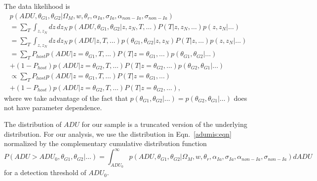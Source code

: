 \documentclass[preprint]{aastex}
\begin{document}
The data likelihood is 
\begin{multline}
p(\mathit{ADU}, \theta_{G1}, \theta_{G2} | \Omega_M, w, \theta_r, \alpha_{Ia},\sigma_{Ia}, \alpha_{\mathit{non-Ia}},\sigma_{\mathit{non-Ia}})  \\
= \sum_{T}\int_{z,z_N} dz\,dz_N \, p(\mathit{ADU, \theta_{G1}, \theta_{G2}}| z , z_N, T, \ldots)P(T| z, z_N,\ldots) p(z, z_N|\ldots)\\
 =\sum_{T} \int_{z,z_N} dz\,dz_N\, p(\mathit{ADU}| z ,T, \ldots)p(\theta_{G1}, \theta_{G2}| z , z_N) P(T| z, \ldots) p(z, z_N|\ldots)\\
= \sum_{T} P_{host} p(\mathit{ADU}| z=\theta_{G1} ,T, \ldots) P(T| z=\theta_{G1}, \ldots) p(\theta_{G1},\theta_{G2}|\ldots) \\
 +  (1-P_{host}) p(\mathit{ADU}| z=\theta_{G2} ,T, \ldots) P(T| z=\theta_{G2}, \ldots) p(\theta_{G2},
 \theta_{G1}|\ldots)\\
\propto \sum_{T} P_{host} p(\mathit{ADU}| z=\theta_{G1} ,T, \ldots) P(T| z=\theta_{G1}, \ldots) \\
 +  (1-P_{host}) p(\mathit{ADU}| z=\theta_{G2} ,T, \ldots) P(T| z=\theta_{G2}, \ldots),
\label{adumis:eqn}
\end{multline}
where we take advantage of the fact that
$p(\theta_{G1}, \theta_{G2} | \ldots) = p(\theta_{G2}, \theta_{G1} | \ldots)$ does
not have parameter dependence.

The distribution of $\mathit{ADU}$ for our sample is a truncated version of the
underlying distribution.  
For our analysis, we use the distribution in  Eqn.~\ref{adumis:eqn} normalized by
the complementary cumulative distribution function
\begin{equation}
P(\mathit{ADU}>\mathit{ADU}_0, \theta_{G1}, \theta_{G2}|\ldots) = \int_{\mathit{ADU}_0}^{\infty} p(\mathit{ADU}, \theta_{G1}, \theta_{G2}|\Omega_M, w, \theta_r, \alpha_{Ia},\sigma_{Ia}, \alpha_{\mathit{non-Ia}},\sigma_{\mathit{non-Ia}})d\mathit{ADU}
\end{equation}
for a detection threshold of $\mathit{ADU}_0$.

\end{document}
